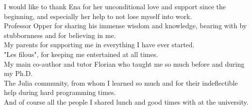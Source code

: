 

\begin{acknowledgements}      %

I would like to thank Ena for her unconditional love and support since the beginning, and especially her help to not lose myself into work.\\
Professor Opper for sharing his immense wisdom and knowledge, bearing with by stubbornness and for believing in me.\\
My parents for supporting me in everything I have ever started.\\
"Les filous", for keeping me entertained at all times.\\
My main co-author and tutor Florian who taught me so much before and during my Ph.D.\\
The Julia community, from whom I learned so much and for their indeflectible help during hard programming times.\\
And of course all the people I shared lunch and good times with at the university.

\end{acknowledgements}



